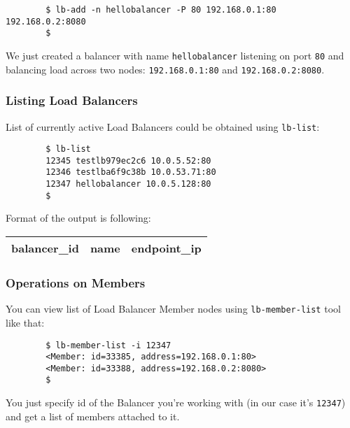 \documentclass[a4paper]{report}
\begin{document}
                 \begin{verbatim}
		$ lb-add -n hellobalancer -P 80 192.168.0.1:80 192.168.0.2:8080
		$
                 \end{verbatim}

                 We just created a balancer with name \texttt{hellobalancer} listening on
                 port \texttt{80} and balancing load across two nodes: \texttt{192.168.0.1:80}
                 and \texttt{192.168.0.2:8080}.

                 \subsubsection{Listing Load Balancers}
                 List of currently active Load Balancers could be obtained using \texttt{lb-list}:

                 \begin{verbatim}
		$ lb-list
		12345 testlb979ec2c6 10.0.5.52:80
		12346 testlba6f9c38b 10.0.53.71:80
		12347 hellobalancer 10.0.5.128:80
		$
                 \end{verbatim}

                 Format of the output is following:

                 \begin{center}
                   \begin{tabular}{ | c | c | c | }
                     \hline
                       balancer\_id & name & endpoint\_ip \\
                     \hline
                   \end{tabular}
                 \end{center}

                 \subsubsection{Operations on Members}
                 You can view list of Load Balancer Member nodes using \texttt{lb-member-list} tool like that:

                 \begin{verbatim}
		$ lb-member-list -i 12347
		<Member: id=33385, address=192.168.0.1:80>
		<Member: id=33388, address=192.168.0.2:8080>
		$
                 \end{verbatim}

                 You just specify id of the Balancer you're working with (in our case it's \texttt{12347}) and get
                 a list of members attached to it.
\end{document}
